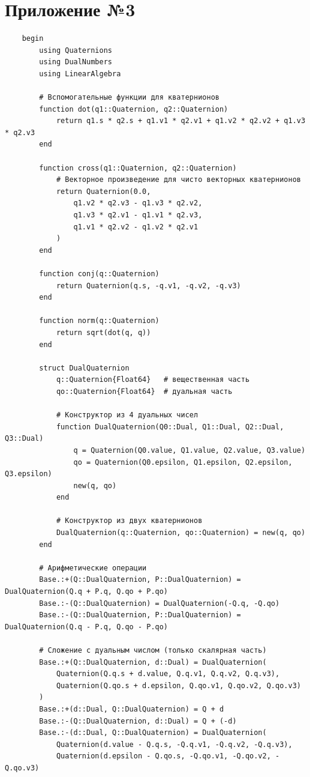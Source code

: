 \section{Приложение №3}

\begin{verbatim}
    begin
        using Quaternions
        using DualNumbers
        using LinearAlgebra
        
        # Вспомогательные функции для кватернионов
        function dot(q1::Quaternion, q2::Quaternion)
            return q1.s * q2.s + q1.v1 * q2.v1 + q1.v2 * q2.v2 + q1.v3 * q2.v3
        end
        
        function cross(q1::Quaternion, q2::Quaternion)
            # Векторное произведение для чисто векторных кватернионов
            return Quaternion(0.0, 
                q1.v2 * q2.v3 - q1.v3 * q2.v2,
                q1.v3 * q2.v1 - q1.v1 * q2.v3,
                q1.v1 * q2.v2 - q1.v2 * q2.v1
            )
        end
        
        function conj(q::Quaternion)
            return Quaternion(q.s, -q.v1, -q.v2, -q.v3)
        end
        
        function norm(q::Quaternion)
            return sqrt(dot(q, q))
        end
        
        struct DualQuaternion
            q::Quaternion{Float64}   # вещественная часть
            qo::Quaternion{Float64}  # дуальная часть
            
            # Конструктор из 4 дуальных чисел
            function DualQuaternion(Q0::Dual, Q1::Dual, Q2::Dual, Q3::Dual)
                q = Quaternion(Q0.value, Q1.value, Q2.value, Q3.value)
                qo = Quaternion(Q0.epsilon, Q1.epsilon, Q2.epsilon, Q3.epsilon)
                new(q, qo)
            end
            
            # Конструктор из двух кватернионов
            DualQuaternion(q::Quaternion, qo::Quaternion) = new(q, qo)
        end
        
        # Арифметические операции
        Base.:+(Q::DualQuaternion, P::DualQuaternion) = DualQuaternion(Q.q + P.q, Q.qo + P.qo)
        Base.:-(Q::DualQuaternion) = DualQuaternion(-Q.q, -Q.qo)
        Base.:-(Q::DualQuaternion, P::DualQuaternion) = DualQuaternion(Q.q - P.q, Q.qo - P.qo)
        
        # Сложение с дуальным числом (только скалярная часть)
        Base.:+(Q::DualQuaternion, d::Dual) = DualQuaternion(
            Quaternion(Q.q.s + d.value, Q.q.v1, Q.q.v2, Q.q.v3),
            Quaternion(Q.qo.s + d.epsilon, Q.qo.v1, Q.qo.v2, Q.qo.v3)
        )
        Base.:+(d::Dual, Q::DualQuaternion) = Q + d
        Base.:-(Q::DualQuaternion, d::Dual) = Q + (-d)
        Base.:-(d::Dual, Q::DualQuaternion) = DualQuaternion(
            Quaternion(d.value - Q.q.s, -Q.q.v1, -Q.q.v2, -Q.q.v3),
            Quaternion(d.epsilon - Q.qo.s, -Q.qo.v1, -Q.qo.v2, -Q.qo.v3)

\end{verbatim}
